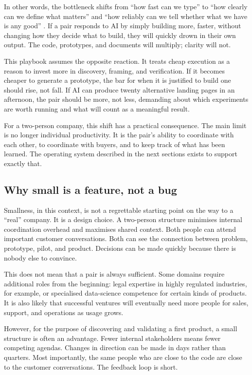 \documentclass[10pt, a4paper, twocolumn]{article} %
\begin{document}
In other words, the bottleneck shifts from “how fast can we type” to “how clearly can we define what matters” and “how reliably can we tell whether what we have is any good” \citep{ries2011lean,bland2019testing,blomgren2025coordination}. If a pair responds to AI by simply building more, faster, without changing how they decide what to build, they will quickly drown in their own output. The code, prototypes, and documents will multiply; clarity will not.

This playbook assumes the opposite reaction. It treats cheap execution as a reason to invest more in discovery, framing, and verification. If it becomes cheaper to generate a prototype, the bar for when it is justified to build one should rise, not fall. If AI can produce twenty alternative landing pages in an afternoon, the pair should be more, not less, demanding about which experiments are worth running and what will count as a meaningful result.

For a two-person company, this shift has a practical consequence. The main limit is no longer individual productivity. It is the pair’s ability to coordinate with each other, to coordinate with buyers, and to keep track of what has been learned. The operating system described in the next sections exists to support exactly that.

\subsection{Why small is a feature, not a bug}

Smallness, in this context, is not a regrettable starting point on the way to a “real” company. It is a design choice. A two-person structure minimises internal coordination overhead and maximises shared context. Both people can attend important customer conversations. Both can see the connection between problem, prototype, pilot, and product. Decisions can be made quickly because there is nobody else to convince.

This does not mean that a pair is always sufficient. Some domains require additional roles from the beginning: legal expertise in highly regulated industries, for example, or specialised data-science competence for certain kinds of products. It is also likely that successful ventures will eventually need more people for sales, support, and operations as usage grows.

However, for the purpose of discovering and validating a first product, a small structure is often an advantage. Fewer internal stakeholders means fewer competing agendas. Changes in direction can be made in days rather than quarters. Most importantly, the same people who are close to the code are close to the customer conversations. The feedback loop is short.
\end{document}
